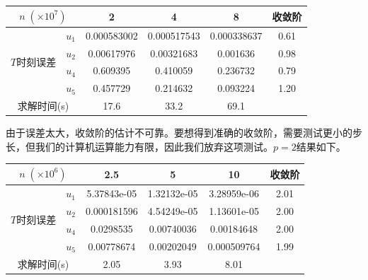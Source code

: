 \documentclass[lang=cn,10pt,bibend=bibtex]{elegantbook}
\begin{document}
\vspace{-.5em}
\begin{table}[H]
  \centering
  \renewcommand\arraystretch{0.85}
  \begin{tabular}{cc|ccc|c}
  \multicolumn{2}{c|}{$n\;(\times 10^7)$}                  & 2 & 4 & 8  & 收敛阶 \\ \hline
  \multicolumn{1}{c|}{\multirow{4}{*}{$T$时刻误差}} & \multicolumn{1}{c|}{$u_1$} &  0.000583002  &  0.000517543  & 0.000338637    &  0.61   \\
  \multicolumn{1}{c|}{}                         & \multicolumn{1}{c|}{$u_2$} &   0.00617976    & 0.00321683  & 0.001636    &  0.98   \\
  \multicolumn{1}{c|}{}                         & \multicolumn{1}{c|}{$u_4$} &   0.609395    & 0.410059  & 0.236732     &  0.79   \\
  \multicolumn{1}{c|}{}                         & \multicolumn{1}{c|}{$u_5$} &   0.457729    & 0.214632  & 0.093224     &  1.20  \\ \hline
  \multicolumn{2}{c|}{求解时间(s)} & 17.6 & 33.2 & 69.1 & 
  \end{tabular}
\end{table}
\vspace{-.8em}

由于误差太大，收敛阶的估计不可靠。要想得到准确的收敛阶，需要测试更小的步长，但我们的计算机运算能力有限，因此我们放弃这项测试。$p=2$结果如下。

\vspace{-.5em}
\begin{table}[H]
  \centering
  \renewcommand\arraystretch{0.85}
  \begin{tabular}{cc|ccc|c}
  \multicolumn{2}{c|}{$n\;(\times 10^6)$}                  & 2.5 & 5 & 10  & 收敛阶 \\ \hline
  \multicolumn{1}{c|}{\multirow{4}{*}{$T$时刻误差}} & \multicolumn{1}{c|}{$u_1$} &  5.37843e-05  &  1.32132e-05  & 3.28959e-06    &  2.01   \\
  \multicolumn{1}{c|}{}                         & \multicolumn{1}{c|}{$u_2$} &   0.000181596    & 4.54249e-05  & 1.13601e-05    &  2.00   \\
  \multicolumn{1}{c|}{}                         & \multicolumn{1}{c|}{$u_4$} &   0.0298535    & 0.00740036  & 0.00184648     &  2.00   \\
  \multicolumn{1}{c|}{}                         & \multicolumn{1}{c|}{$u_5$} &   0.00778674   & 0.00202049  & 0.000509764     &  1.99  \\ \hline
  \multicolumn{2}{c|}{求解时间(s)} & 2.05 & 3.93 & 8.01 & 
  \end{tabular}
\end{table}
\vspace{-.8em}
\end{document}
